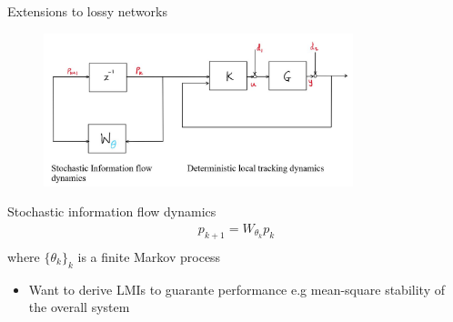 \begin{frame}{Extensions to lossy networks}
	\begin{figure}[h!]
		\includegraphics[width=9cm]{doc/2_Formation_control/stoch_decoupled_architecture.jpg}
		\label{fig:control_arch}	
	\end{figure}
	Stochastic information flow dynamics
	\begin{equation*}\label{eqn:perturbed_information_flow_dynamics}
	\begin{split}
	p_{k+1}=W_{\theta_k}p_k \\
	\end{split}
	\end{equation*}
	where $\{\theta_k\}_k$ is a finite Markov process 
	\begin{itemize}
		\item Want to derive LMIs to guarante performance e.g mean-square stability of the overall system
	\end{itemize}
\end{frame}

